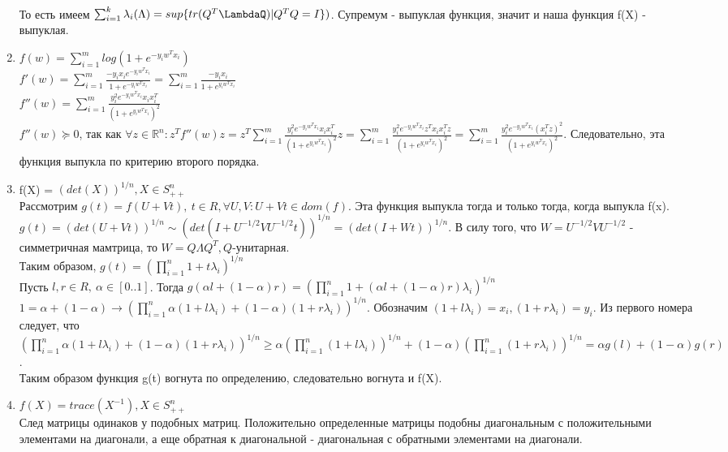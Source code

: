 \documentclass[12pt]{extreport}
\theoremstyle{definiton}
\theoremstyle{definition}
\theoremstyle{definition}
\let\geq\geqslant
\begin{document}
\begin{enumerate}
        \\То есть имеем $\sum_{i=1}^k \lambda_i(\Lambda) = sup\{tr(Q^T\LambdaQ)|Q^TQ=I\})$. Супремум - выпуклая функция, значит и наша функция f(X) - выпуклая.
        \item $f(w)=\sum_{i=1}^{m}log(1+e^{-y_iw^Tx_i})$
        \\$f'(w) = \sum_{i=1}^{m}\frac{-y_ix_ie^{-y_iw^Tx_i}}{1+e^{-y_iw^Tx_i}}=\sum_{i=1}^{m}\frac{-y_ix_i}{1+e^{y_iw^Tx_i}}$
        \\$f''(w) = \sum_{i=1}^{m}\frac{y_i^2e^{-y_iw^Tx_i}x_ix_i^T}{(1+e^{y_iw^Tx_i})^2}$
        \\$f''(w) \succeq 0$, так как $\forall z \in \mathbb{R}^n: z^Tf''(w)z = z^T\sum_{i=1}^{m}\frac{y_i^2e^{-y_iw^Tx_i}x_ix_i^T}{(1+e^{y_iw^Tx_i})^2}z = \sum_{i=1}^{m}\frac{y_i^2e^{-y_iw^Tx_i}z^Tx_ix_i^Tz}{(1+e^{y_iw^Tx_i})^2} = \sum_{i=1}^{m}\frac{y_i^2e^{-y_iw^Tx_i}(x_i^Tz)^2}{(1+e^{y_iw^Tx_i})^2}$. Следовательно, эта функция выпукла по критерию второго порядка.
        \item f(X) = $(det(X))^{1/n}, X \in S_{++}^n$
        \\ Рассмотрим $g(t) = f(U+Vt),\ t\in R,\forall U,V:U+Vt\in dom(f)$. Эта функция выпукла тогда и только тогда, когда выпукла f(x). $g(t) = (det(U+Vt))^{1/n}\sim(det(I+U^{-1/2}VU^{-1/2}t))^{1/n}=(det(I+Wt))^{1/n}$. В силу того, что $W=U^{-1/2}VU^{-1/2}$ - симметричная мамтрица, то $W = Q\Lambda Q^T, Q$-унитарная.
        \\Таким образом, $g(t) = (\prod_{i=1}^{n} 1+t\lambda_i)^{1/n}$
        \\ Пусть $l,r \in R,\ \alpha \in [0..1]$. Тогда $g(\alpha l + (1-\alpha)r) = (\prod_{i=1}^{n} 1+(\alpha l + (1-\alpha)r)\lambda_i)^{1/n}$ $1 = \alpha + (1-\alpha) \to (\prod_{i=1}^{n} \alpha(1+l\lambda_i) + (1-\alpha)(1+r\lambda_i))^{1/n}$. Обозначим $(1+l\lambda_i) = x_i, (1+r\lambda_i) = y_i$. Из первого номера следует, что $(\prod_{i=1}^{n} \alpha(1+l\lambda_i) + (1-\alpha)(1+r\lambda_i))^{1/n} \geq \alpha (\prod_{i=1}^{n}(1+l\lambda_i))^{1/n} + (1-\alpha)(\prod_{i=1}^{n}(1+r\lambda_i))^{1/n} = \alpha g(l) + (1-\alpha)g(r)$. 
        \\ Таким образом функция g(t) вогнута по определению, следовательно вогнута и f(X).
        \item $f(X) = trace(X^{-1}), X \in S_{++}^n$
        \\ След матрицы одинаков у подобных матриц. Положительно определенные матрицы подобны диагональным с положительными элементами на диагонали, а еще обратная к диагональной - диагональная с обратными элементами на диагонали. 

\end{enumerate}
\end{document}
